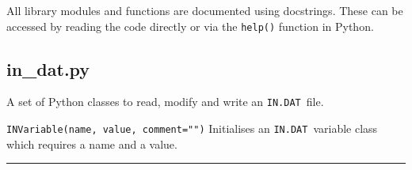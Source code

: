 \documentclass[11pt,a4paper]{report}
\newcommand{\indat}{\mbox{\texttt{IN.DAT}}}
\begin{document}
All library modules and functions are documented using docstrings. These can
be accessed by reading the code directly or via the \texttt{help()} function
in Python.

\subsection{in\_dat.py}

A set of Python classes to read, modify and write an \indat\ file.

\begin{description}

\item{\verb|INVariable(name, value, comment="")| } Initialises an \indat\
  variable class which requires a name and a value.

\end{description}

\rule{\textwidth}{0.4pt}
\end{document}
